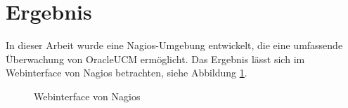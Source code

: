 \section{Ergebnis}

In dieser Arbeit wurde eine Nagios-Umgebung entwickelt, die eine umfassende Überwachung von \gls{OracleUCM} ermöglicht.
Das Ergebnis lässt sich im Webinterface von Nagios betrachten, siehe Abbildung \ref{nweb}.



\begin{figure}[ht]
	\centering
		\caption{Webinterface von Nagios}
		\label{nweb}
\end{figure}

